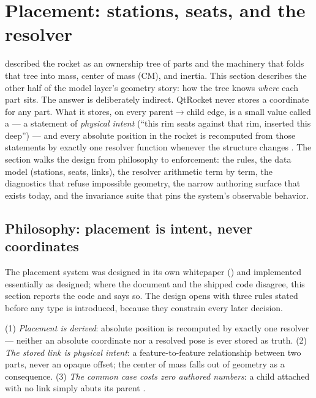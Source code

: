 \section{Placement: stations, seats, and the resolver}\label{sec:placement}

 described the rocket as an ownership tree of parts and the machinery that
folds that tree into mass, center of mass (CM), and inertia. This section describes the
other half of the model layer's geometry story: how the tree knows \emph{where} each part
sits. The answer is deliberately indirect. QtRocket never stores a coordinate for any part.
What it stores, on every parent$\to$child edge, is a small value called a
 --- a statement of \emph{physical intent} (``this rim seats against that
rim, inserted this deep'') --- and every absolute position in the rocket is recomputed from
those statements by exactly one resolver function whenever the structure changes
. The section walks the design from philosophy to
enforcement: the rules, the data model (stations, seats, links), the resolver arithmetic
term by term, the diagnostics that refuse impossible geometry, the narrow authoring
surface that exists today, and the invariance suite that pins the system's observable
behavior.

\subsection{Philosophy: placement is intent, never coordinates}\label{sec:placement-philosophy}

The placement system was designed in its own whitepaper
() and implemented essentially as designed; where the
document and the shipped code disagree, this section reports the code and says so. The
design opens with three rules stated before any type is introduced, because they constrain
every later decision.

\begin{designrule}
(1) \emph{Placement is derived}: absolute position is recomputed by exactly one resolver
--- neither an absolute coordinate nor a resolved pose is ever stored as truth.
(2) \emph{The stored link is physical intent}: a feature-to-feature relationship between
two parts, never an opaque offset; the center of mass falls out of geometry as a
consequence. (3) \emph{The common case costs zero authored numbers}: a child attached with
no link simply abuts its parent
.
\end{designrule}

